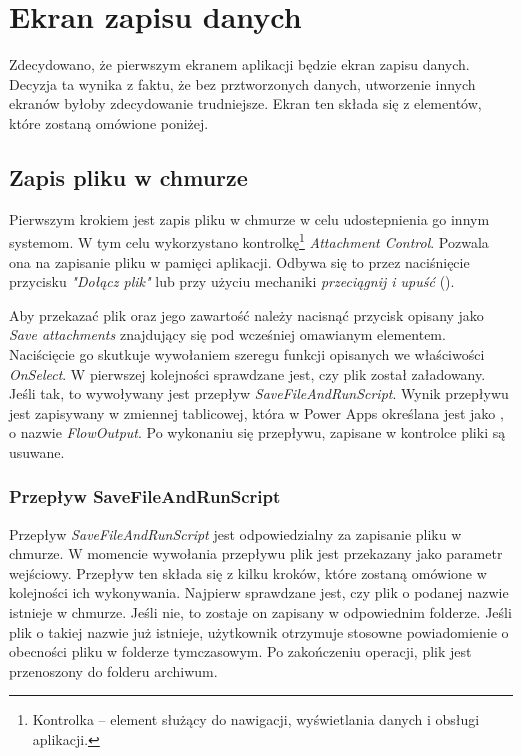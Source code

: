 \section{Ekran zapisu danych}

Zdecydowano, że pierwszym ekranem aplikacji będzie ekran zapisu danych. Decyzja ta wynika z faktu, że bez prztworzonych danych, utworzenie innych ekranów byłoby zdecydowanie trudniejsze. Ekran ten składa się z elementów, które zostaną omówione poniżej.

\subsection{Zapis pliku w chmurze}
Pierwszym krokiem jest zapis pliku w chmurze w celu udostepnienia go innym systemom. W tym celu wykorzystano kontrolkę\footnote{Kontrolka -- element służący do nawigacji, wyświetlania danych i obsługi aplikacji.} \emph{Attachment Control}. Pozwala ona na zapisanie pliku w pamięci aplikacji. Odbywa się to przez naciśnięcie przycisku \emph{"Dołącz plik"} lub przy użyciu mechaniki \emph{przeciągnij i upuść} (). 

Aby przekazać plik oraz jego zawartość należy nacisnąć przycisk opisany jako \emph{Save attachments} znajdujący się pod wcześniej omawianym elementem. Naciścięcie go skutkuje wywołaniem szeregu funkcji opisanych we właściwości \emph{OnSelect}. W pierwszej kolejności sprawdzane jest, czy plik został załadowany. Jeśli tak, to wywoływany jest przepływ \emph{SaveFileAndRunScript}. Wynik przepływu jest zapisywany w zmiennej tablicowej, która w Power Apps określana jest jako , o nazwie \emph{FlowOutput}. Po wykonaniu się przepływu, zapisane w kontrolce pliki są usuwane.

\subsubsection{Przepływ SaveFileAndRunScript}
Przepływ \emph{SaveFileAndRunScript} jest odpowiedzialny za zapisanie pliku w chmurze. W momencie wywołania przepływu plik jest przekazany jako parametr wejściowy. Przepływ ten składa się z kilku kroków, które zostaną omówione w kolejności ich wykonywania. Najpierw sprawdzane jest, czy plik o podanej nazwie istnieje w chmurze. Jeśli nie, to zostaje on zapisany w odpowiednim folderze. Jeśli plik o takiej nazwie już istnieje, użytkownik otrzymuje stosowne powiadomienie o obecności pliku w folderze tymczasowym. Po zakończeniu operacji, plik jest przenoszony do folderu archiwum.
